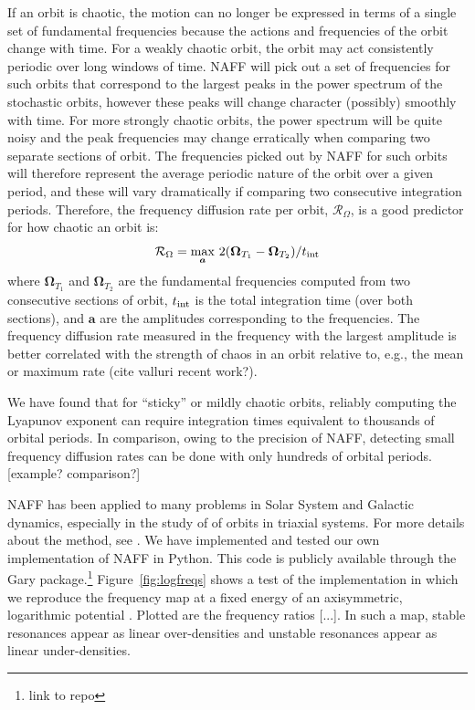 \documentclass[letterpaper,12pt,preprint]{aastex}
\newcommand{\bs}[1]{\boldsymbol{#1}}
\newcommand{\inttime}{t_{\rm int}}
\begin{document}
If an orbit is chaotic, the motion can no longer be expressed in terms of a single set of fundamental frequencies because the actions and frequencies of the orbit change with time. For a weakly chaotic orbit, the orbit may act consistently periodic over long windows of time. NAFF will pick out a set of frequencies for such orbits that correspond to the largest peaks in the power spectrum of the stochastic orbits, however these peaks will change character (possibly) smoothly with time. For more strongly chaotic orbits, the power spectrum will be quite noisy and the peak frequencies may change erratically when comparing two separate sections of orbit. The frequencies picked out by NAFF for such orbits will therefore represent the average periodic nature of the orbit over a given period, and these will vary dramatically if comparing two consecutive integration periods. Therefore, the frequency diffusion rate per orbit, $\mathcal{R}_\Omega$, is a good predictor for how chaotic an orbit is:
\begin{equation}
	\mathcal{R}_\Omega = \max_{\bs{a}}\,2(\bs{\Omega}_{T_1} - \bs{\Omega}_{T_2}) / \inttime
\end{equation}
where $\bs{\Omega}_{T_1}$ and $\bs{\Omega}_{T_2}$ are the fundamental frequencies computed from two consecutive sections of orbit, $\inttime$ is the total integration time (over both sections), and $\bs{a}$ are the amplitudes corresponding to the frequencies. The frequency diffusion rate measured in the frequency with the largest amplitude is better correlated with the strength of chaos in an orbit relative to, e.g., the mean or maximum rate (cite valluri recent work?).

We have found that for ``sticky'' or mildly chaotic orbits, reliably computing the Lyapunov exponent can require integration times equivalent to thousands of orbital periods. In comparison, owing to the precision of NAFF, detecting small frequency diffusion rates can be done with only hundreds of orbital periods. [example? comparison?] 

NAFF has been applied to many problems in Solar System and Galactic dynamics, especially in the study of of orbits in triaxial systems. For more details about the method, see \cite{papaphillipou, laskar, etc.}. We have implemented and tested our own implementation of NAFF in Python. This code is publicly available through the Gary package.\footnote{link to repo} Figure~\ref{fig:logfreqs} shows a test of the implementation in which we reproduce the frequency map at a fixed energy of an axisymmetric, logarithmic potential \cite[][pg. 260, Figure~3.45]{binneytremaine}. Plotted are the frequency ratios [...]. In such a map, stable resonances appear as linear over-densities and unstable resonances appear as linear under-densities. 
\end{document}
